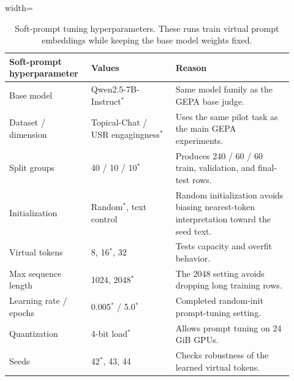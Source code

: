 \documentclass[12pt,a4paper,twoside,openright]{book}
\begin{document}
\begin{table}[!htb]
    \centering
    \scriptsize
    \begin{adjustbox}{width=\textwidth}
    \begin{tabular}{p{0.25\linewidth} p{0.28\linewidth} p{0.39\linewidth}}
        \toprule
        \textbf{Soft-prompt hyperparameter} & \textbf{Values} & \textbf{Reason} \\
        \midrule
        Base model &
        Qwen2.5-7B-Instruct$^*$ &
        Same model family as the GEPA base judge. \\
        Dataset / dimension &
        Topical-Chat / USR engagingness$^*$ &
        Uses the same pilot task as the main GEPA experiments. \\
        Split groups &
        40 / 10 / 10$^*$ &
        Produces 240 / 60 / 60 train, validation, and final-test rows. \\
        Initialization &
        Random$^*$, text control &
        Random initialization avoids biasing nearest-token interpretation toward the seed text. \\
        Virtual tokens &
        8, 16$^*$, 32 &
        Tests capacity and overfit behavior. \\
        Max sequence length &
        1024, 2048$^*$ &
        The 2048 setting avoids dropping long training rows. \\
        Learning rate / epochs &
        0.005$^*$ / 5.0$^*$ &
        Completed random-init prompt-tuning setting. \\
        Quantization &
        4-bit load$^*$ &
        Allows prompt tuning on 24 GiB GPUs. \\
        Seeds &
        42$^*$, 43, 44 &
        Checks robustness of the learned virtual tokens. \\
        \bottomrule
    \end{tabular}
    \end{adjustbox}
    \caption{Soft-prompt tuning hyperparameters. These runs train virtual
    prompt embeddings while keeping the base model weights fixed.}
    \label{tab:soft-prompt-hyperparameters}
\end{table}
\end{document}

